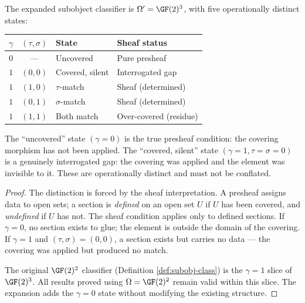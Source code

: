 \begin{proposition}
\label{prop:gf2-cubed}
The expanded subobject classifier is
$\Omega' = \GF(2)^3$, with five operationally distinct
states:
\begin{center}
\begin{tabular}{c|c|l|l}
$\gamma$ & $(\tau, \sigma)$ & State & Sheaf status \\
\hline
$0$ & --- & Uncovered & Pure presheaf \\
$1$ & $(0,0)$ & Covered, silent & Interrogated gap \\
$1$ & $(1,0)$ & $\tau$-match & Sheaf (determined) \\
$1$ & $(0,1)$ & $\sigma$-match & Sheaf (determined) \\
$1$ & $(1,1)$ & Both match & Over-covered (residue)
\end{tabular}
\end{center}
The ``uncovered'' state $(\gamma = 0)$ is the true
presheaf condition: the covering morphism has not been
applied. The ``covered, silent'' state
$(\gamma = 1, \tau = \sigma = 0)$ is a genuinely
interrogated gap: the covering was applied and the
element was invisible to it. These are operationally
distinct and must not be conflated.
\end{proposition}

\begin{proof}
The distinction is forced by the sheaf interpretation.
A presheaf assigns data to open sets; a section is
\emph{defined} on an open set $U$ if $U$ has been
covered, and \emph{undefined} if $U$ has not. The
sheaf condition applies only to defined sections.
If $\gamma = 0$, no section exists to glue; the element
is outside the domain of the covering. If $\gamma = 1$
and $(\tau, \sigma) = (0,0)$, a section exists but
carries no data --- the covering was applied but
produced no match.

The original $\GF(2)^2$ classifier (Definition
\ref{def:subobj-class}) is the $\gamma = 1$ slice of
$\GF(2)^3$. All results proved using $\Omega = \GF(2)^2$
remain valid within this slice. The expansion adds the
$\gamma = 0$ state without modifying the existing
structure.
\end{proof}

